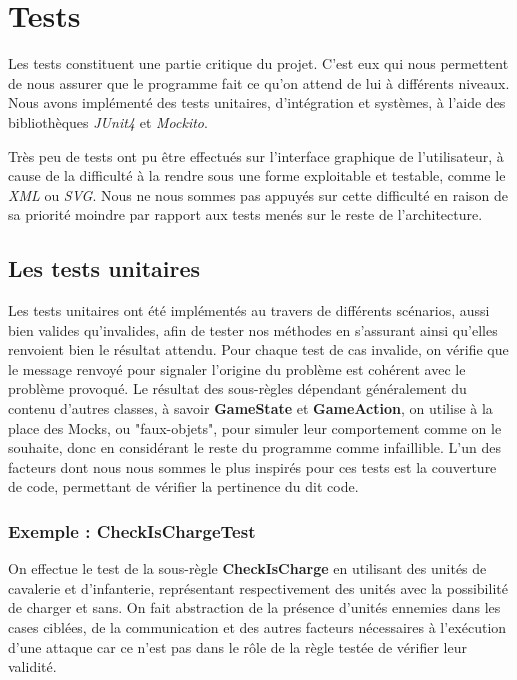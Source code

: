 \documentclass[a4paper]{report}
\begin{document}

\chapter{Tests}
Les tests constituent une partie critique du projet. C'est eux qui nous permettent de nous assurer que le programme fait ce qu'on attend de lui à différents niveaux. Nous avons implémenté des tests unitaires, d'intégration et systèmes, à l'aide des bibliothèques {\it JUnit4} et {\it Mockito}.

Très peu de tests ont pu être effectués sur l'interface graphique de l'utilisateur, à cause de la difficulté à la rendre sous une forme exploitable et testable, comme le {\it XML} ou {\it SVG}. Nous ne nous sommes pas appuyés sur cette difficulté en raison de sa priorité moindre par rapport aux tests menés sur le reste de l'architecture.

\section{Les tests unitaires}
Les tests unitaires ont été implémentés au travers de différents scénarios, aussi bien valides qu'invalides, afin de tester nos méthodes en s'assurant ainsi qu'elles renvoient bien le résultat attendu. Pour chaque test de cas invalide, on vérifie que le message renvoyé pour signaler l'origine du problème est cohérent avec le problème provoqué. Le résultat des sous-règles dépendant généralement du contenu d'autres classes, à savoir \textbf{GameState} et \textbf{GameAction}, on utilise à la place des Mocks, ou "faux-objets", pour simuler leur comportement comme on le souhaite, donc en considérant le reste du programme comme infaillible. L'un des facteurs dont nous nous sommes le plus inspirés pour ces tests est la couverture de code, permettant de vérifier la pertinence du dit code.

\subsection*{Exemple : CheckIsChargeTest}

On effectue le test de la sous-règle \textbf{CheckIsCharge} en utilisant des unités de cavalerie et d'infanterie, représentant respectivement des unités avec la possibilité de charger et sans. On fait abstraction de la présence d'unités ennemies dans les cases ciblées, de la communication et des autres facteurs nécessaires à l'exécution d'une attaque car ce n'est pas dans le rôle de la règle testée de vérifier leur validité.
\end{document}

